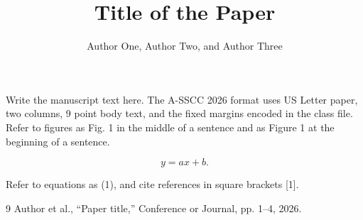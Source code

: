 \documentclass{asscc2026}
\title{Title of the Paper}
\author{Author One\authorrefmark{1}, Author Two\authorrefmark{2}, and Author Three\authorrefmark{1}}
\begin{document}
\maketitle

Write the manuscript text here. The A-SSCC 2026 format uses US Letter paper, two columns, 9 point body text, and the fixed margins encoded in the class file. Refer to figures as Fig. 1 in the middle of a sentence and as Figure 1 at the beginning of a sentence.

\begin{equation}
  y = ax + b .
\end{equation}

Refer to equations as (1), and cite references in square brackets [1].

\begin{thebibliography}{9}
Author et al., ``Paper title,'' Conference or Journal, pp. 1--4, 2026.
\end{thebibliography}

\clearpage
\onecolumn

\ASSCCFigurePage
  {}
  {}
  {}
  {}
  {}
  {}

\ASSCCFigurePage
  {}
  {}
  {}
  {}
  {}
  {}
\end{document}
